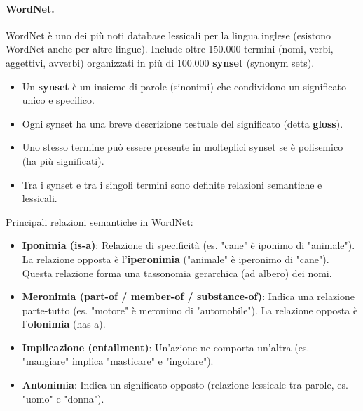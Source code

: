 \documentclass{article}
\begin{document}
\paragraph{WordNet.}
WordNet è uno dei più noti database lessicali per la lingua inglese (esistono WordNet anche per altre lingue). Include oltre 150.000 termini (nomi, verbi, aggettivi, avverbi) organizzati in più di 100.000 \textbf{synset} (synonym sets).
\begin{itemize}
    \item Un \textbf{synset} è un insieme di parole (sinonimi) che condividono un significato unico e specifico.
    \item Ogni synset ha una breve descrizione testuale del significato (detta \textbf{gloss}).
    \item Uno stesso termine può essere presente in molteplici synset se è polisemico (ha più significati).
    \item Tra i synset e tra i singoli termini sono definite relazioni semantiche e lessicali.
\end{itemize}
Principali relazioni semantiche in WordNet:
\begin{itemize}
    \item \textbf{Iponimia (is-a)}: Relazione di specificità (es. "cane" è iponimo di "animale"). La relazione opposta è l'\textbf{iperonimia} ("animale" è iperonimo di "cane"). Questa relazione forma una tassonomia gerarchica (ad albero) dei nomi.
    \item \textbf{Meronimia (part-of / member-of / substance-of)}: Indica una relazione parte-tutto (es. "motore" è meronimo di "automobile"). La relazione opposta è l'\textbf{olonimia} (has-a).
    \item \textbf{Implicazione (entailment)}: Un'azione ne comporta un'altra (es. "mangiare" implica "masticare" e "ingoiare").
    \item \textbf{Antonimia}: Indica un significato opposto (relazione lessicale tra parole, es. "uomo" e "donna").
\end{itemize}
\end{document}
